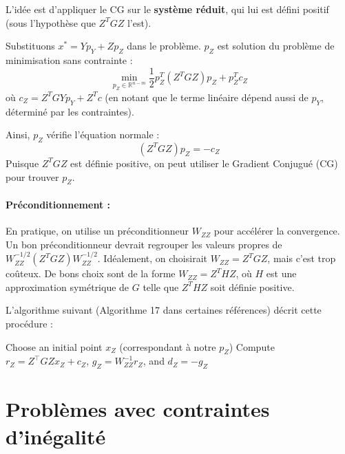 L'idée est d'appliquer le CG sur le \textbf{système réduit}, qui lui est défini positif (sous l'hypothèse que $Z^T G Z$ l'est).

Substituons $x^* = Y p_Y + Z p_Z$ dans le problème.
$p_Z$ est solution du problème de minimisation sans contrainte :
\begin{equation}
    \min_{p_Z \in \mathbb{R}^{n-m}} \frac{1}{2} p_Z^T (Z^T G Z) p_Z + p_Z^T c_Z
\end{equation}
où $c_Z = Z^T G Y p_Y + Z^T c$ (en notant que le terme linéaire dépend aussi de $p_Y$, déterminé par les contraintes).

Ainsi, $p_Z$ vérifie l'équation normale :
\begin{equation}
    (Z^T G Z) p_Z = -c_Z
\end{equation}
Puisque $Z^T G Z$ est définie positive, on peut utiliser le Gradient Conjugué (CG) pour trouver $p_Z$.

\paragraph{Préconditionnement :}
En pratique, on utilise un préconditionneur $W_{ZZ}$ pour accélérer la convergence. Un bon préconditionneur devrait regrouper les valeurs propres de $W_{ZZ}^{-1/2} (Z^T G Z) W_{ZZ}^{-1/2}$.
Idéalement, on choisirait $W_{ZZ} = Z^T G Z$, mais c'est trop coûteux.
De bons choix sont de la forme $W_{ZZ} = Z^T H Z$, où $H$ est une approximation symétrique de $G$ telle que $Z^T H Z$ soit définie positive.

L'algorithme suivant (Algorithme 17 dans certaines références) décrit cette procédure :

\begin{algorithm}[H]
    \caption{Preconditioned Conjugate Gradient for reduced systems}
    \SetAlgoLined
    Choose an initial point $x_Z$ (correspondant à notre $p_Z$)\;
    Compute $r_Z=Z^\top GZx_Z + c_Z$, $g_Z=W_{ZZ}^{-1}r_Z$, and $d_Z=-g_Z$\;
\end{algorithm}

\section{Problèmes avec contraintes d'inégalité}

